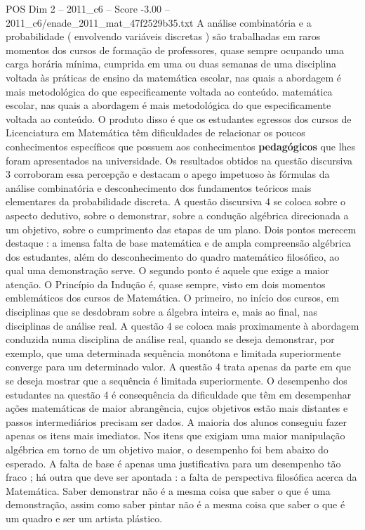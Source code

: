 \begin{textsample}{POS Dim 2 – 2011\_c6 – Score -3.00 – 2011\_c6/enade\_2011\_mat\_47f2529b35.txt}
A análise combinatória e a probabilidade ( envolvendo variáveis discretas ) são trabalhadas em raros momentos dos cursos de formação de professores, quase sempre ocupando uma carga horária mínima, cumprida em uma ou duas semanas de uma disciplina voltada às práticas de ensino da matemática escolar, nas quais a abordagem é mais metodológica do que especificamente voltada ao conteúdo. matemática escolar, nas quais a abordagem é mais metodológica do que especificamente voltada ao conteúdo.
O produto disso é que os estudantes egressos dos cursos de Licenciatura em Matemática têm dificuldades de relacionar os poucos conhecimentos específicos que possuem aos conhecimentos \textbf{pedagógicos} que lhes foram apresentados na universidade.
Os resultados obtidos na questão discursiva 3 corroboram essa percepção e destacam o apego impetuoso às fórmulas da análise combinatória e desconhecimento dos fundamentos teóricos mais elementares da probabilidade discreta.
A questão discursiva 4 se coloca sobre o aspecto dedutivo, sobre o demonstrar, sobre a condução algébrica direcionada a um objetivo, sobre o cumprimento das etapas de um plano.
Dois pontos merecem destaque : a imensa falta de base matemática e de ampla compreensão algébrica dos estudantes, além do desconhecimento do quadro matemático filosófico, ao qual uma demonstração serve.
O segundo ponto é aquele que exige a maior atenção.
O Princípio da Indução é, quase sempre, visto em dois momentos emblemáticos dos cursos de Matemática.
O primeiro, no início dos cursos, em disciplinas que se desdobram sobre a álgebra inteira e, mais ao final, nas disciplinas de análise real.
A questão 4 se coloca mais proximamente à abordagem conduzida numa disciplina de análise real, quando se deseja demonstrar, por exemplo, que uma determinada sequência monótona e limitada superiormente converge para um determinado valor.
A questão 4 trata apenas da parte em que se deseja mostrar que a sequência é limitada superiormente.
O desempenho dos estudantes na questão 4 é consequência da dificuldade que têm em desempenhar ações matemáticas de maior abrangência, cujos objetivos estão mais distantes e passos intermediários precisam ser dados.
A maioria dos alunos conseguiu fazer apenas os itens mais imediatos.
Nos itens que exigiam uma maior manipulação algébrica em torno de um objetivo maior, o desempenho foi bem abaixo do esperado.
A falta de base é apenas uma justificativa para um desempenho tão fraco ; há outra que deve ser apontada : a falta de perspectiva filosófica acerca da Matemática.
Saber demonstrar não é a mesma coisa que saber o que é uma demonstração, assim como saber pintar não é a mesma coisa que saber o que é um quadro e ser um artista plástico.

\end{textsample}
